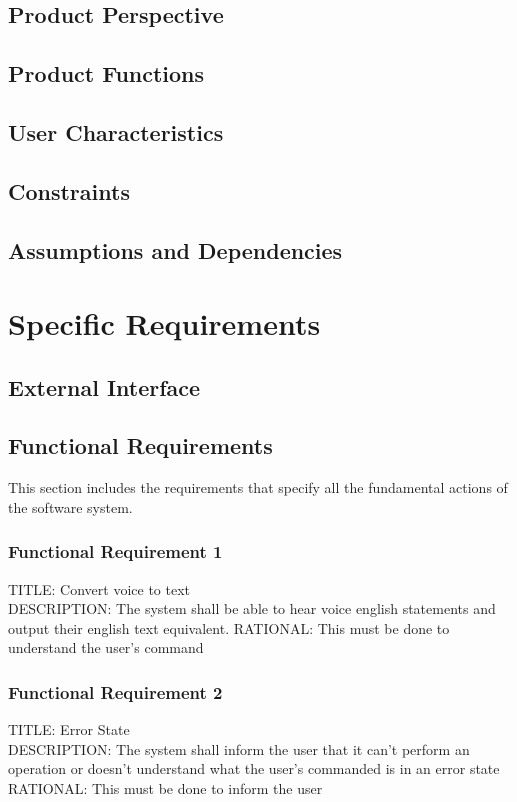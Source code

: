 \documentclass[onecolumn, draftclsnofoot,10pt, compsoc]{IEEEtran}
\begin{document}
    \subsection{Product Perspective}
        
    \subsection{Product Functions}
    \subsection{User Characteristics}
    \subsection{Constraints}
    \subsection{Assumptions and Dependencies}


\section{Specific Requirements}
    \subsection{External Interface}
    \subsection{Functional Requirements}
    This section includes the requirements that specify all the fundamental actions of the software system.
    	\subsubsection{Functional Requirement 1}
        TITLE: Convert voice to text \\
        DESCRIPTION: The system shall be able to hear voice english statements and output their english text equivalent.
        RATIONAL: This must be done to understand the user's command 
        
        \subsubsection{Functional Requirement 2}
        TITLE: Error State \\
        DESCRIPTION: The system shall inform the user that it can't perform an operation or doesn't understand what the user's commanded is in an error state \\
        RATIONAL: This must be done to inform the user 
        
\end{document}
